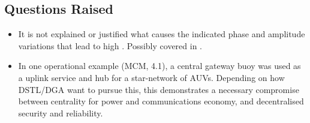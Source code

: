 \subsection{Questions Raised}
\begin{itemize}
  \item It is not explained or justified what causes the indicated phase and
  amplitude variations that lead to high . Possibly covered in
  \cite{Catipovic1990}.
  \item In one operational example (MCM, 4.1), a central gateway buoy was used
  as a uplink service and hub for a star-network of AUVs. Depending on how
  DSTL/DGA want to pursue this, this demonstrates a necessary compromise
  between centrality for power and communications economy, and decentralised security and
  reliability.
\end{itemize}
